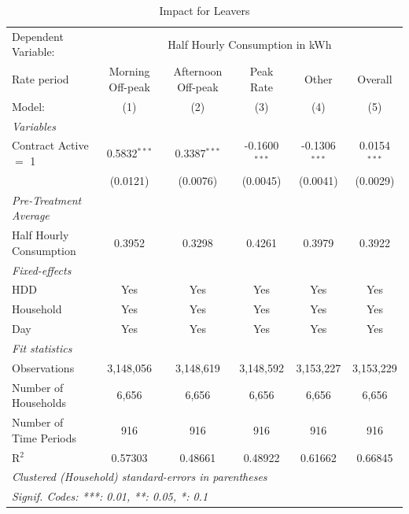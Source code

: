 
\begin{table}[htbp]
   \caption{\label{tab:did-leavers} Impact for Leavers}
   \centering
   \begin{tabular}{lccccc}
      \tabularnewline \midrule \midrule
      Dependent Variable: & \multicolumn{5}{c}{Half Hourly Consumption in kWh}\\
      Rate period                    & Morning Off-peak & Afternoon Off-peak & Peak Rate       & Other           & Overall \\   
      Model:                         & (1)              & (2)                & (3)             & (4)             & (5)\\  
      \midrule
      \emph{Variables}\\
      Contract Active $=$ 1          & 0.5832$^{***}$   & 0.3387$^{***}$     & -0.1600$^{***}$ & -0.1306$^{***}$ & 0.0154$^{***}$\\   
                                     & (0.0121)         & (0.0076)           & (0.0045)        & (0.0041)        & (0.0029)\\   
\midrule
\emph{Pre-Treatment Average}\\
      Half Hourly Consumption        & 0.3952           & 0.3298             & 0.4261          & 0.3979          & 0.3922\\  
      \midrule
      \emph{Fixed-effects}\\
      HDD                            & Yes              & Yes                & Yes             & Yes             & Yes\\  
      Household                      & Yes              & Yes                & Yes             & Yes             & Yes\\  
      Day                            & Yes              & Yes                & Yes             & Yes             & Yes\\  
      \midrule
      \emph{Fit statistics}\\
      Observations                   & 3,148,056        & 3,148,619          & 3,148,592       & 3,153,227       & 3,153,229\\  
      Number of Households & 6,656            & 6,656              & 6,656           & 6,656           & 6,656\\  
      Number of Time Periods         & 916              & 916                & 916             & 916             & 916\\  
      R$^2$                          & 0.57303          & 0.48661            & 0.48922         & 0.61662         & 0.66845\\  
      \midrule \midrule
      \multicolumn{6}{l}{\emph{Clustered (Household) standard-errors in parentheses}}\\
      \multicolumn{6}{l}{\emph{Signif. Codes: ***: 0.01, **: 0.05, *: 0.1}}\\
   \end{tabular}
\end{table}


